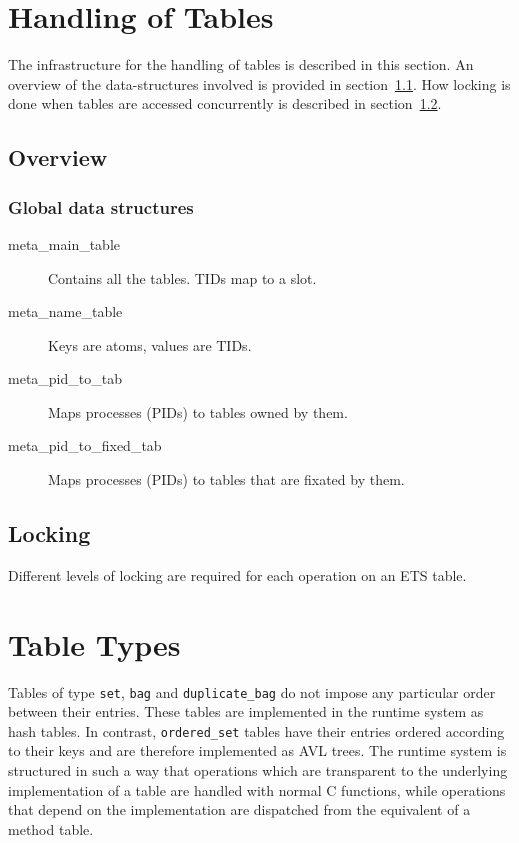 \documentclass[aps,pre,preprint,nofootinbib]{revtex4}
\begin{document}
\section{Handling of Tables}

The infrastructure for the handling of tables is described in this section. 
An overview of the data-structures involved is provided in section~\ref{sec:tables_overview}.
How locking is done when tables are accessed concurrently is described in section~\ref{sec:tables_locking}.

\subsection{Overview} \label{sec:tables_overview}

\subsubsection{Global data structures}

\begin{description}
  \item[meta\_main\_table] Contains all the tables. TIDs map to a slot.
  \item[meta\_name\_table] Keys are atoms, values are TIDs.
  \item[meta\_pid\_to\_tab] Maps processes (PIDs) to tables owned by them.
  \item[meta\_pid\_to\_fixed\_tab] Maps processes (PIDs) to tables that are
    fixated by them.
\end{description}

\subsection{Locking} \label{sec:tables_locking}

Different levels of locking are required for each operation on an ETS table.

\section{Table Types} \label{sec:table_types}

Tables of type \verb|set|, \verb|bag| and \verb|duplicate_bag| do not impose any particular order between their entries. These tables are implemented in the runtime system as hash tables. In contrast, \verb|ordered_set| tables have their entries ordered according to their keys and are therefore implemented as AVL trees. The runtime system is structured in such a way that operations which are transparent to the underlying implementation of a table are handled with normal C functions, while operations that depend on the implementation are dispatched from the equivalent of a method table.
\end{document}
